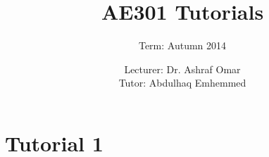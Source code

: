 \documentclass[fontsize=12pt,parskip=full, headings=small]{scrreprt}
\title{AE301 Tutorials}
\subtitle{Term: Autumn 2014}
\date{}
\author{Lecturer: Dr. Ashraf Omar \\
Tutor: Abdulhaq Emhemmed}
\begin{document}
\maketitle
\chapter{Tutorial 1}

\end{document}
